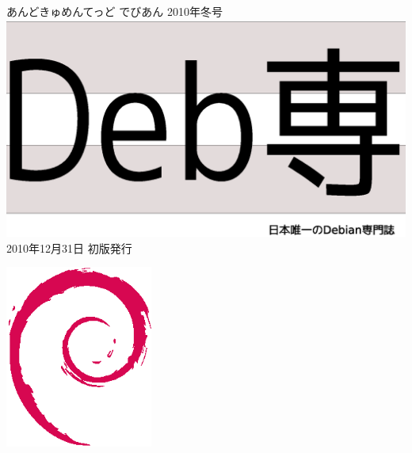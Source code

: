 \documentclass[mingoth,a4paper]{jsarticle}
\begin{document}
\begin{titlepage}
\thispagestyle{empty}

\vspace*{-2cm}
あんどきゅめんてっど でびあん 2010年冬号\\
\hspace*{-2cm}
\includegraphics[width=210mm]{image2010-natsu/debsen.eps}\\
\hfill 2010年12月31日 初版発行



\vspace*{-2cm}
\hfill{}\includegraphics[height=6cm]{image200502/openlogo-nd.eps}
\end{titlepage}

\newpage
\thispagestyle{empty}\mbox{}
\newpage
\end{document}
